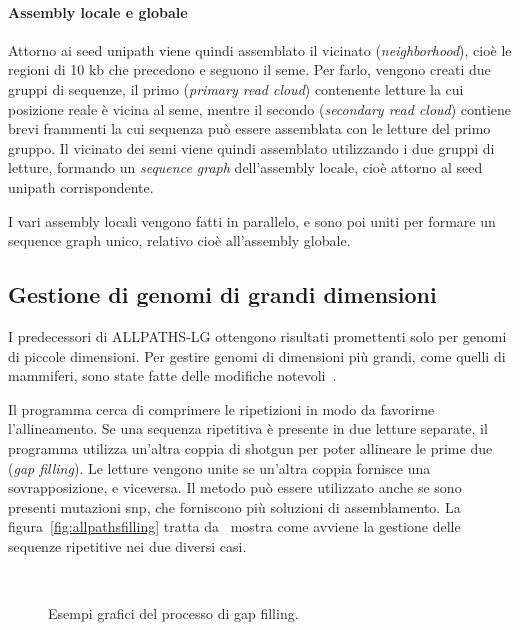\documentclass[crop=false, class=book]{standalone}
\begin{document}
	\paragraph{Assembly locale e globale}
	Attorno ai seed unipath viene quindi assemblato il vicinato (\textit{neighborhood}), cioè le regioni di 10 kb che precedono e seguono il seme. Per farlo, vengono creati due gruppi di sequenze, il primo (\textit{primary read cloud}) contenente letture la cui posizione reale è vicina al seme, mentre il secondo (\textit{secondary read cloud}) contiene brevi frammenti la cui sequenza può essere assemblata con le letture del primo gruppo. Il vicinato dei semi viene quindi assemblato utilizzando i due gruppi di letture, formando un \textit{sequence graph} dell'assembly locale, cioè attorno al seed unipath corrispondente.
	
	I vari assembly locali vengono fatti in parallelo, e sono poi uniti per formare un sequence graph unico, relativo cioè all'assembly globale.
	
	
	\subsection{Gestione di genomi di grandi dimensioni}
	I predecessori di ALLPATHS-LG ottengono risultati promettenti solo per genomi di piccole dimensioni. Per gestire genomi di dimensioni più grandi, come quelli di mammiferi, sono state fatte delle modifiche notevoli~\cite{gnerre2011high}.

	Il programma cerca di comprimere le ripetizioni in modo da favorirne l'allineamento. Se una sequenza ripetitiva è presente in due letture separate, il programma utilizza un'altra coppia di shotgun per poter allineare le prime due (\textit{gap filling}). Le letture vengono unite se un'altra coppia fornisce una sovrapposizione, e viceversa. Il metodo può essere utilizzato anche se sono presenti mutazioni \gls{snp}, che forniscono più soluzioni di assemblamento. La figura~\vref{fig:allpathsfilling} tratta da~\cite{gnerre2011high} mostra come avviene la gestione delle sequenze ripetitive nei due diversi casi.

	\begin{figure}
		\centering
		 \\
		\caption{Esempi grafici del processo di gap filling.}
		\label{fig:allpathsfilling}
	\end{figure}
	
\end{document}

